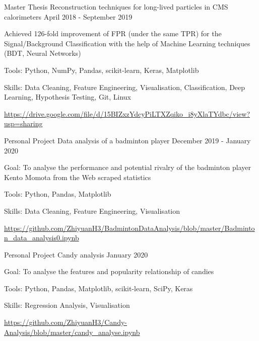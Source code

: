 
\begin{cventries}
  \cventry
    {Master Thesis} %
    {Reconstruction techniques for long-lived particles in CMS calorimeters} %
    {} %
    {April 2018 - September 2019} %
    {
      \begin{cvitems} %
        \item {Achieved 126-fold improvement of FPR (under the same TPR) for the Signal/Background Classification with the help of Machine Learning techniques (BDT, Neural Networks)}
        \item {Tools: Python, NumPy, Pandas, scikit-learn, Keras, Matplotlib}
        \item {Skills: Data Cleaning, Feature Engineering, Visualisation, Classification, Deep Learning, Hypothesis Testing, Git, Linux}
		\item {\url{https://drive.google.com/file/d/15BIZxzYdcyPiLTXZqiko_i8yXlaTYdbc/view?usp=sharing}}
      \end{cvitems}
    }


  \cventry
    {Personal Project} %
    {Data analysis of a badminton player} %
    {} %
    {December 2019 - January 2020} %
    {
      \begin{cvitems} %
      	\item {Goal: To analyse the performance and potential rivalry of the badminton player Kento Momota from the Web scraped statistics}
		\item {Tools: Python, Pandas, Matplotlib}
        \item {Skills: Data Cleaning, Feature Engineering, Visualisation}
        \item {\url{https://github.com/ZhiyuanH3/BadmintonDataAnalysis/blob/master/Badminton_data_analysis0.ipynb}}
      \end{cvitems}
    }


  \cventry
    {Personal Project} %
    {Candy analysis} %
    {} %
    {January 2020} %
    {
      \begin{cvitems} %
      	\item {Goal: To analyse the features and popularity relationship of candies}
		\item {Tools: Python, Pandas, Matplotlib, scikit-learn, SciPy, Keras}
        \item {Skills: Regression Analysis, Visualisation}
        \item {\url{https://github.com/ZhiyuanH3/Candy-Analysis/blob/master/candy_analyse.ipynb}}
      \end{cvitems}
    }
    
    
\end{cventries}
